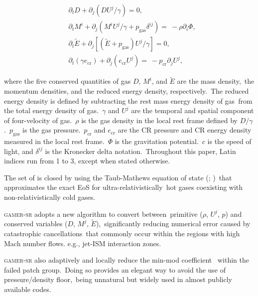 \documentclass[twocolumn]{aastex631}
\begin{document}
  \begin{subequations}
    \label{governing-eq}
    \begin{align}
     &\partial_{t} D+\partial_{j} \left(DU^{j}/\gamma\right)=0,\label{D evolution}\\
     &\partial_{t} M^{i}+\partial_{j} \left(M^{i}U^{j}/\gamma+p_{\text{gas}}\delta^{ij}\right)=\
     -\rho\partial_{i}\Phi,\label{M evolution}\\
     &\partial_{t} \tilde{E}+\partial_j \left[\left(\tilde{E}+p_{\text{gas}}\right)U^{j}/\gamma\right]=0, \label{E evoltion}\\
     &\partial_{t} \left(\gamma e_{\text{cr}}\right) + \partial_{j} \left(e_{\text{cr}}U^{j}\right)=\
     -p_{\text{cr}} \partial_{j} U^{j},\label{D evolution}
    \end{align}
  \end{subequations}


  where the five conserved quantities of gas $D$, $M^{i}$, and $\tilde{E}$ are the mass density,\
  the momentum densities, and the reduced energy density, respectively.\
  The reduced energy density is defined by subtracting the rest mass energy density of gas\
  from the total energy density of gas.\
  $\gamma$ and $U^{j}$ are the temporal and spatial component of four-velocity of gas.\
  $\rho$ is the gas density in the local rest frame defined by $D/\gamma$.\
  $p_{\text{gas}}$ is the gas pressure.\
  $p_{\text{cr}}$ and $e_{\text{cr}}$ are the CR pressure and CR energy density measured in the local rest frame.\
  $\Phi$ is the gravitation potential.\
  $c$ is the speed of light, and $\delta^{ij}$ is the Kronecker delta notation.\
  Throughout this paper, Latin indices run from 1 to 3, except when stated otherwise.\

  The set of \Cref{governing-eq} is closed by using the Taub-Mathews equation of state (\citealt{Taub}; \citealt{TM_EOS})\
  that approximates the exact EoS \citep{Synge} for ultra-relativistically\
  hot gases coexisting with non-relativistically cold gases.

  \textsc{gamer-sr} adopts a new algorithm \citep{tseng2021} to convert between\
  primitive ($\rho$, $U^{j}$, $p$) and conserved variables ($D$, $M^{j}$, $\tilde{E}$),\
  significantly reducing numerical error caused by catastrophic cancellations\
  that commonly occur within the regions with high Mach number flows. e.g., jet-ISM interaction zones.

  \textsc{gamer-sr} also adaptively and locally reduce the min-mod coefficient\
  \citep{tseng2021} within the failed patch group.\
  Doing so provides an elegant way to avoid the use of pressure/density floor,\
  being unnatural but widely used in almost publicly available codes.\
\end{document}
